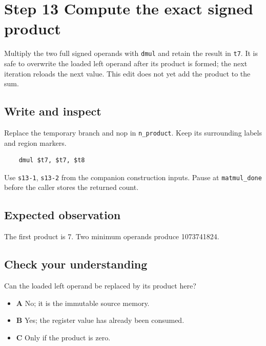 \section{Step 13 Compute the exact signed product}\label{matmul-s13}

Multiply the two full signed operands with \texttt{dmul} and retain the result in \texttt{t7}. It is safe to overwrite the loaded left operand after its product is formed; the next iteration reloads the next value. This edit does not yet add the product to the sum.

\subsection{Write and inspect}
Replace the temporary branch and nop in \texttt{n\_product}. Keep its surrounding labels and region markers.

\begin{verbatim}
    dmul $t7, $t7, $t8
\end{verbatim}
Use \texttt{s13-1}, \texttt{s13-2} from the companion construction inputs. Pause at \texttt{matmul\_done} before the caller stores the returned count.

\subsection{Expected observation}
The first product is 7. Two minimum operands produce 1073741824.

\subsection{Check your understanding}
Can the loaded left operand be replaced by its product here?

\begin{itemize}
  \item \textbf{A} No; it is the immutable source memory.
  \item \textbf{B} Yes; the register value has already been consumed.
  \item \textbf{C} Only if the product is zero.
\end{itemize}
